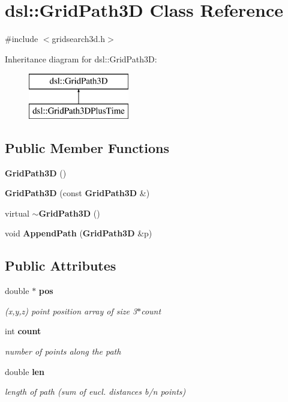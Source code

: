 \section{dsl\-:\-:\-Grid\-Path3\-D \-Class \-Reference}
\label{classdsl_1_1GridPath3D}


{\ttfamily \#include $<$gridsearch3d.\-h$>$}

\-Inheritance diagram for dsl\-:\-:\-Grid\-Path3\-D\-:\begin{figure}[H]
\begin{center}
\leavevmode
\includegraphics[height=2.000000cm]{classdsl_1_1GridPath3D}
\end{center}
\end{figure}
\subsection*{\-Public \-Member \-Functions}
\begin{DoxyCompactItemize}
\item 
{\bf \-Grid\-Path3\-D} ()
\item 
{\bf \-Grid\-Path3\-D} (const {\bf \-Grid\-Path3\-D} \&)
\item 
virtual {\bf $\sim$\-Grid\-Path3\-D} ()
\item 
void {\bf \-Append\-Path} ({\bf \-Grid\-Path3\-D} \&p)
\end{DoxyCompactItemize}
\subsection*{\-Public \-Attributes}
\begin{DoxyCompactItemize}
\item 
double $\ast$ {\bf pos}
\begin{DoxyCompactList}\small\item\em (x,y,z) point position array of size 3$\ast$count \end{DoxyCompactList}\item 
int {\bf count}
\begin{DoxyCompactList}\small\item\em number of points along the path \end{DoxyCompactList}\item 
double {\bf len}
\begin{DoxyCompactList}\small\item\em length of path (sum of eucl. distances b/n points) \end{DoxyCompactList}\end{DoxyCompactItemize}


